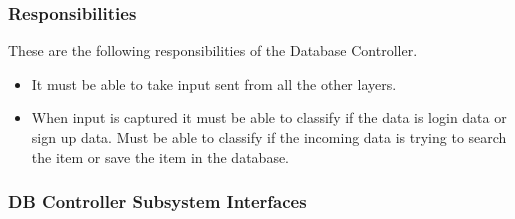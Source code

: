 \subsubsection{Responsibilities}
These are the following responsibilities of the Database Controller.
\begin{itemize}
    \item It must be able to take input sent from all the other layers.  
    \item When input is captured it must be able to classify if the data is login data or sign up data. Must be able to classify if the incoming data is trying to search the item or save the item in the database.
\end{itemize}

\subsubsection{DB Controller Subsystem Interfaces}


